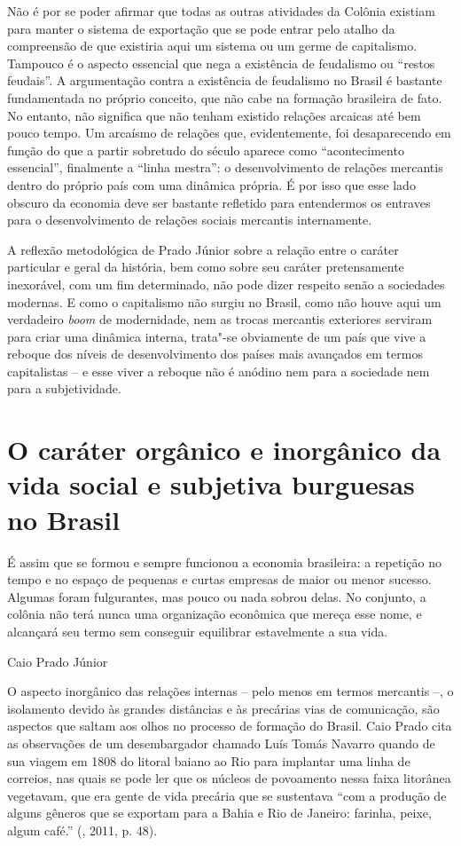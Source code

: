 Não é por se poder afirmar que todas as outras atividades da Colônia
existiam para manter o sistema de exportação que se pode entrar pelo
atalho da compreensão de que existiria aqui um sistema ou um germe de
capitalismo. Tampouco é o aspecto essencial que nega a existência de
feudalismo ou ``restos feudais''. A argumentação contra a existência de
feudalismo no Brasil é bastante fundamentada no próprio conceito, que
não cabe na formação brasileira de fato. No entanto, não significa que
não tenham existido relações arcaicas até bem pouco tempo. Um arcaísmo
de relações que, evidentemente, foi desaparecendo em função do que a
partir sobretudo do século  aparece como ``acontecimento essencial'',
finalmente a ``linha mestra'': o desenvolvimento de relações mercantis dentro do
próprio país com uma dinâmica própria. É por isso que esse lado obscuro
da economia deve ser bastante refletido para entendermos os entraves
para o desenvolvimento de relações sociais mercantis internamente.

A reflexão metodológica de Prado Júnior sobre a relação entre o caráter
particular e geral da história, bem como sobre seu caráter pretensamente
inexorável, com um fim determinado, não pode dizer respeito senão a
sociedades modernas. E como o capitalismo não surgiu no Brasil, como não
houve aqui um verdadeiro \emph{boom} de modernidade, nem as trocas
mercantis exteriores serviram para criar uma dinâmica interna, trata"-se
obviamente de um país que vive a reboque dos níveis de desenvolvimento
dos países mais avançados em termos capitalistas -- e esse viver a
reboque não é anódino nem para a sociedade nem para a subjetividade.

\section{O caráter orgânico e inorgânico da vida social e subjetiva burguesas no Brasil}

\epigraph{É assim que se formou e sempre funcionou a economia brasileira: a
repetição no tempo e no espaço de pequenas e curtas empresas de maior ou
menor sucesso. Algumas foram fulgurantes, mas pouco ou nada sobrou
delas. No conjunto, a colônia não terá nunca uma organização econômica
que mereça esse nome, e alcançará seu termo sem conseguir equilibrar
estavelmente a sua vida.}{Caio Prado Júnior}


O aspecto inorgânico das relações internas -- pelo menos em termos
mercantis --, o isolamento devido às grandes distâncias e às precárias
vias de comunicação, são aspectos que saltam aos olhos no processo de
formação do Brasil. Caio Prado cita as observações de um desembargador
chamado Luís Tomás Navarro quando de sua viagem em 1808 do litoral
baiano ao Rio para implantar uma linha de correios, nas quais se pode
ler que os núcleos de povoamento nessa faixa litorânea vegetavam, que
era gente de vida precária que se sustentava ``com a produção de alguns
gêneros que se exportam para a Bahia e Rio de Janeiro: farinha, peixe,
algum café.'' (, 2011, p. 48).

